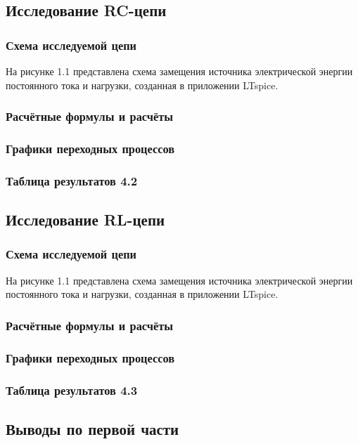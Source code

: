 \subsection{Исследование RC-цепи}

\subsubsection{Схема исследуемой цепи}
На рисунке 1.1 представлена схема замещения источника электрической энергии постоянного тока и нагрузки, созданная в приложении LTspice.


\subsubsection{Расчётные формулы и расчёты}

\subsubsection{Графики переходных процессов}

\subsubsection{Таблица результатов 4.2}

\subsection{Исследование RL-цепи}

\subsubsection{Схема исследуемой цепи}
На рисунке 1.1 представлена схема замещения источника электрической энергии постоянного тока и нагрузки, созданная в приложении LTspice.


\subsubsection{Расчётные формулы и расчёты}

\subsubsection{Графики переходных процессов}

\subsubsection{Таблица результатов 4.3}

\subsection{Выводы по первой части}
